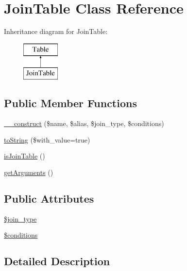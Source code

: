 \hypertarget{classJoinTable}{\section{Join\-Table Class Reference}
\label{classJoinTable}
}
Inheritance diagram for Join\-Table\-:\begin{figure}[H]
\begin{center}
\leavevmode
\includegraphics[height=2.000000cm]{classJoinTable}
\end{center}
\end{figure}
\subsection*{Public Member Functions}
\begin{DoxyCompactItemize}
\item 
\hyperlink{classJoinTable_a78264892680506bbc3bd66c300f7074c}{\-\_\-\-\_\-construct} (\$name, \$alias, \$join\-\_\-type, \$conditions)
\item 
\hyperlink{classJoinTable_aa1e393a7b04e3b591ebd0fe6dff46f42}{to\-String} (\$with\-\_\-value=true)
\item 
\hyperlink{classJoinTable_aa26630df96bb0dac2ddcccff34c91530}{is\-Join\-Table} ()
\item 
\hyperlink{classJoinTable_a2f8aae7c1c5d0879f1085b9280018b4e}{get\-Arguments} ()
\end{DoxyCompactItemize}
\subsection*{Public Attributes}
\begin{DoxyCompactItemize}
\item 
\hyperlink{classJoinTable_a00c6a8c44beb3b85c9f3a3e5be03fba8}{\$join\-\_\-type}
\item 
\hyperlink{classJoinTable_aeaff6b550d1e29eef836ed19a8d65a99}{\$conditions}
\end{DoxyCompactItemize}


\subsection{Detailed Description}


